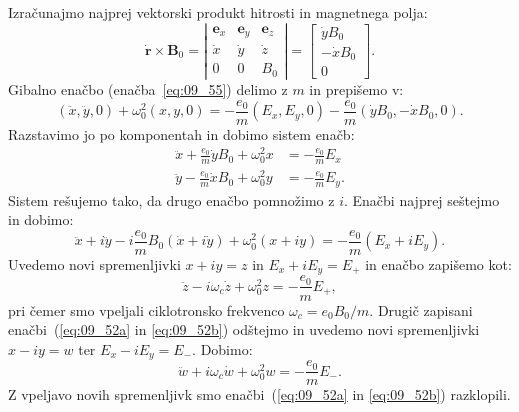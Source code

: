 Izračunajmo najprej vektorski produkt hitrosti in magnetnega polja:
\begin{equation}
\dot{\mathbf{r}} \times \mathbf{B}_0 = 
\left|
\begin{array}{ccc}
\mathbf{e}_x & \mathbf{e}_y & \mathbf{e}_z\\
\dot{x} & \dot{y} & \dot{z}\\
0 & 0 & B_{0}
\end{array}\right|
= 
\left[
\begin{array}{c}
\dot{y} B_0\\
-\dot{x} B_0\\
0
\end{array}\right]\!\!.
\label{eq:09_60}
\end{equation}
Gibalno enačbo (enačba~\ref{eq:09_55}) delimo z $m$ in prepišemo v:
\begin{equation}
\left(\ddot{x},\ddot{y},0\right) + \omega_0^2 (x,y,0)= -\frac{e_0}{m}(E_x, E_y, 0) - 
\frac{e_0}{m}\left( \dot{y}B_0, -\dot{x} B_0, 0\right).
\label{eq:09_61}
\end{equation}
Razstavimo jo po komponentah in dobimo sistem enačb:
\begin{align}
\ddot{x} + \frac{e_0}{m} \dot{y} B_0 + \omega_0^2 x &= -\frac{e_0}{m}E_x \label{eq:09_52a} \\
\ddot{y} - \frac{e_0}{m} \dot{x} B_0 + \omega_0^2 y &= -\frac{e_0}{m}E_y.
\label{eq:09_52b}
\end{align}
Sistem rešujemo tako, da drugo enačbo pomnožimo z $i$. Enačbi najprej seštejmo in dobimo:
\begin{equation}
\ddot{x} + i\ddot{y} -i \frac{e_0}{m}B_0 (\dot{x} + i\dot{y}) + \omega_0^2 (x+iy) = -\frac{e_0}{m}(E_x+iE_y).
\label{eq:09_62}
\end{equation}
Uvedemo novi spremenljivki $x + iy = z$ in $E_x+iE_y = E_+$ in enačbo zapišemo kot:
\begin{equation}
\ddot{z} -i \omega_{c}\dot{z} + \omega_0^2 z = -\frac{e_0}{m}E_+,
\label{eq:09_63}
\end{equation}
pri čemer smo vpeljali ciklotronsko frekvenco $\omega_{c} = e_0B_0/m$.
Drugič zapisani enačbi~(\ref{eq:09_52a} in \ref{eq:09_52b}) 
odštejmo in uvedemo novi spremenljivki $x-iy=w$ ter $E_x-iE_y = E_-$.
Dobimo:
\begin{equation}
\ddot{w} +i \omega_{c}\dot{w} + \omega_0^2 w = -\frac{e_0}{m}E_-.
\label{eq:09_64}
\end{equation}
Z vpeljavo novih spremenljivk smo enačbi~(\ref{eq:09_52a} in \ref{eq:09_52b}) razklopili. 
